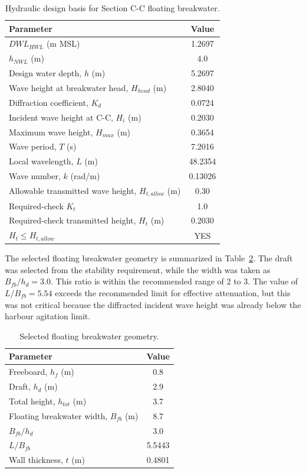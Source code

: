 \documentclass[a4paper, 11pt]{article}
\begin{document}
\begin{table}[H]
\centering
\caption{Hydraulic design basis for Section C-C floating breakwater.}
\label{tab:floating_hydraulic}
\begin{tabular}{l c}
\hline
Parameter & Value \\
\hline
\(DWL_{HWL}\) (m MSL) & 1.2697 \\
\(h_{NWL}\) (m) & 4.0 \\
Design water depth, \(h\) (m) & 5.2697 \\
Wave height at breakwater head, \(H_{head}\) (m) & 2.8040 \\
Diffraction coefficient, \(K_d\) & 0.0724 \\
Incident wave height at C-C, \(H_i\) (m) & 0.2030 \\
Maximum wave height, \(H_{max}\) (m) & 0.3654 \\
Wave period, \(T\) (s) & 7.2016 \\
Local wavelength, \(L\) (m) & 48.2354 \\
Wave number, \(k\) (rad/m) & 0.13026 \\
Allowable transmitted wave height, \(H_{t,allow}\) (m) & 0.30 \\
Required-check \(K_t\) & 1.0 \\
Required-check transmitted height, \(H_t\) (m) & 0.2030 \\
\(H_t \leq H_{t,allow}\) & YES \\
\hline
\end{tabular}
\end{table}

The selected floating breakwater geometry is summarized in Table~\ref{tab:floating_geometry}. The draft was selected from the stability requirement, while the width was taken as \(B_{fb}/h_d=3.0\). This ratio is within the recommended range of 2 to 3. The value of \(L/B_{fb}=5.54\) exceeds the recommended limit for effective attenuation, but this was not critical because the diffracted incident wave height was already below the harbour agitation limit.

\begin{table}[H]
\centering
\caption{Selected floating breakwater geometry.}
\label{tab:floating_geometry}
\begin{tabular}{l c}
\hline
Parameter & Value \\
\hline
Freeboard, \(h_f\) (m) & 0.8\\
Draft, \(h_d\) (m) & 2.9 \\
Total height, \(h_{tot}\) (m) & 3.7 \\
Floating breakwater width, \(B_{fb}\) (m) & 8.7 \\
\(B_{fb}/h_d\) & 3.0 \\
\(L/B_{fb}\) & 5.5443 \\
Wall thickness, \(t\) (m) & 0.4801 \\
\hline
\end{tabular}
\end{table}
\end{document}
